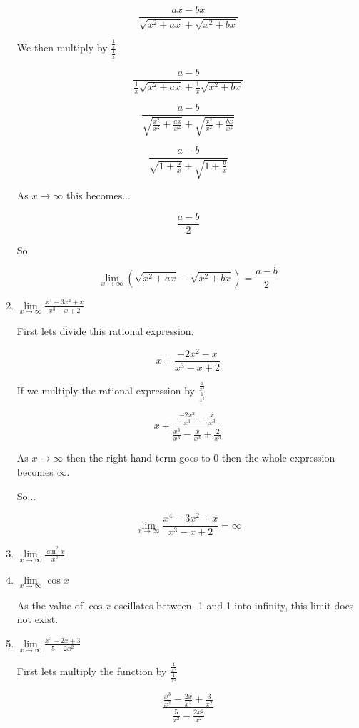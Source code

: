 \documentclass{article}
\begin{document}
\begin{enumerate}
			$$\frac{ax - bx}{ \sqrt{x^2 + ax} + \sqrt{x^2 + bx}}$$

			We then multiply by $\frac{ \frac{1}{x} }{\frac{1}{x}}$

			$$\frac{a - b}{\frac{1}{x}\sqrt{x^2 + ax} + \frac{1}{x}\sqrt{x^2 + bx}}$$

			$$\frac{a - b}{\sqrt{ \frac{x^2}{x^2} + \frac{ax}{x^2}} + \sqrt{\frac{x^2}{x^2} + \frac{bx}{x^2}}}$$

			$$\frac{a-b}{\sqrt{1 + \frac{a}{x}} + \sqrt{1 + \frac{b}{x}}}$$

			As $x \to \infty$ this becomes...

			$$\frac{a-b}{2}$$

			So

			$$\lim \limits _{x \to \infty} (\sqrt{x^2 + ax} - \sqrt{x^2 + bx}) = \frac{a-b}{2}$$

		\item $\lim \limits _{x \to \infty} \frac{x^4 - 3x^2 + x}{x^3 - x + 2}$

			First lets divide this rational expression.

			$$x + \frac{-2x^2-x}{x^3-x+2}$$

			If we multiply the rational expression by $\frac{ \frac{1}{x^3} }{ \frac{1}{x^3} }$

			$$x + \frac{ \frac{-2x^2}{x^3} - \frac{x}{x^3}}{\frac{x^3}{x^3} - \frac{x}{x^3} + \frac{2}{x^3}}$$

			As $x \to \infty$ then the right hand term goes to $0$ then the whole expression becomes $\infty$.

			So...

			$$\lim \limits _{x \to \infty} \frac{x^4 - 3x^2 + x}{x^3 - x + 2} = \infty$$

		\item $\lim \limits _{x \to \infty} \frac{\sin^{2} x}{x^2}$

		\item $\lim \limits _{x \to \infty} \cos x$

			As the value of $\cos x$ oscillates between -1 and 1 into infinity, this
			limit does not exist.

		\item $\lim \limits _{x \to \infty} \frac{x^3 - 2x + 3}{5 - 2x^2}$

			First lets multiply the function by $\frac{ \frac{1}{x^2} }{ \frac{1}{x^2}}$

			$$ \frac{ \frac{x^3}{x^2} - \frac{2x}{x^2} + \frac{3}{x^2} }{ \frac{5}{x^2} - \frac{2x^2}{x^2}} $$
			

\end{enumerate}
\end{document}
